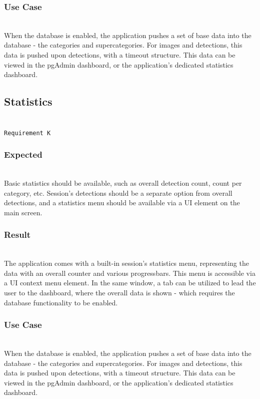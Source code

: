 \documentclass[conference]{IEEEtran}
\begin{document}
\subsubsection{Use Case}~\\
When the database is enabled, the application pushes a set of base data into the database - the categories and supercategories. For images and detections, this data is pushed upon detections, with a timeout structure. This data can be viewed in the pgAdmin dashboard, or the application's dedicated statistics dashboard. 

\subsection{Statistics}~\\
\texttt{Requirement K}~\\
\subsubsection{Expected}~\\
Basic statistics should be available, such as overall detection count, count per category, etc. Session's detections should be a separate option from overall detections, and a statistics menu should be available via a UI element on the main screen.~\\

\subsubsection{Result}~\\
The application comes with a built-in session's statistics menu, representing the data with an overall counter and various progressbars. This menu is accessible via a UI context menu element. In the same window, a tab can be utilized to lead the user to the dashboard, where the overall data is shown - which requires the database functionality to be enabled.~\\

\subsubsection{Use Case}~\\
When the database is enabled, the application pushes a set of base data into the database - the categories and supercategories. For images and detections, this data is pushed upon detections, with a timeout structure. This data can be viewed in the pgAdmin dashboard, or the application's dedicated statistics dashboard. \\
\end{document}
